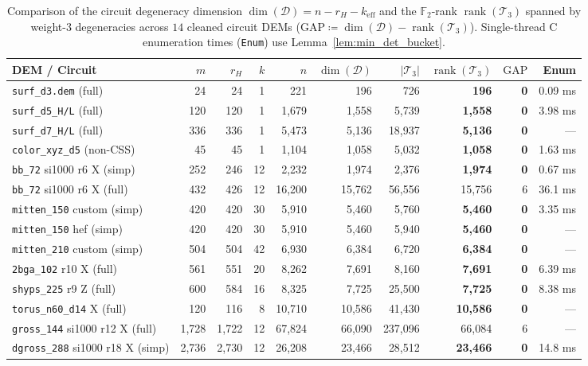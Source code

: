 \documentclass[12pt]{article}
\theoremstyle{definition}
\newcommand{\Ftwo}{\mathbb{F}_2}
\DeclareMathOperator{\rank}{rank}
\newcommand{\Dc}{\mathcal{D}}
\newcommand{\Tc}{\mathcal{T}_3}
\newcommand{\ttt}[1]{\texttt{#1}}
\begin{document}
\begin{table}[htbp]
\centering
\caption{Comparison of the circuit degeneracy dimension $\dim(\Dc) = n - r_H - k_{\mathrm{eff}}$ and the
$\Ftwo$-rank $\rank(\Tc)$ spanned by weight-3 degeneracies across $14$ cleaned circuit DEMs ($\mathrm{GAP}
\coloneqq \dim(\Dc) - \rank(\Tc)$). Single-thread C enumeration times (\ttt{Enum}) use
Lemma~\ref{lem:min_det_bucket}.}\label{tab:t3_span}
\smallskip
\footnotesize
\setlength{\tabcolsep}{4.0pt}
\begin{tabular}{@{}lrrrrrrrrr@{}}
\toprule
DEM / Circuit & $m$ & $r_H$ & $k$ & $n$ & $\dim(\Dc)$ & $|\Tc|$ & $\rank(\Tc)$ & $\mathrm{GAP}$ & Enum \\
\midrule
\ttt{surf\_d3.dem} (full) & 24 & 24 & 1 & 221 & 196 & 726 & \textbf{196} & \textbf{0} & 0.09 ms \\
\ttt{surf\_d5\_H/L} (full) & 120 & 120 & 1 & 1,679 & 1,558 & 5,739 & \textbf{1,558} & \textbf{0} & 3.98 ms \\
\ttt{surf\_d7\_H/L} (full) & 336 & 336 & 1 & 5,473 & 5,136 & 18,937 & \textbf{5,136} & \textbf{0} & --- \\
\ttt{color\_xyz\_d5} (non-CSS) & 45 & 45 & 1 & 1,104 & 1,058 & 5,032 & \textbf{1,058} & \textbf{0} & 1.63 ms \\
\ttt{bb\_72} si1000 r6 X (simp) & 252 & 246 & 12 & 2,232 & 1,974 & 2,376 & \textbf{1,974} & \textbf{0} & 0.67 ms \\
\ttt{bb\_72} si1000 r6 X (full) & 432 & 426 & 12 & 16,200 & 15,762 & 56,556 & 15,756 & 6 & 36.1 ms \\
\ttt{mitten\_150} custom (simp) & 420 & 420 & 30 & 5,910 & 5,460 & 5,760 & \textbf{5,460} & \textbf{0} & 3.35 ms \\
\ttt{mitten\_150} hef (simp) & 420 & 420 & 30 & 5,910 & 5,460 & 5,940 & \textbf{5,460} & \textbf{0} & --- \\
\ttt{mitten\_210} custom (simp) & 504 & 504 & 42 & 6,930 & 6,384 & 6,720 & \textbf{6,384} & \textbf{0} & --- \\
\ttt{2bga\_102} r10 X (full) & 561 & 551 & 20 & 8,262 & 7,691 & 8,160 & \textbf{7,691} & \textbf{0} & 6.39 ms \\
\ttt{shyps\_225} r9 Z (full) & 600 & 584 & 16 & 8,325 & 7,725 & 25,500 & \textbf{7,725} & \textbf{0} & 8.38 ms \\
\ttt{torus\_n60\_d14} X (full) & 120 & 116 & 8 & 10,710 & 10,586 & 41,430 & \textbf{10,586} & \textbf{0} & --- \\
\ttt{gross\_144} si1000 r12 X (full) & 1,728 & 1,722 & 12 & 67,824 & 66,090 & 237,096 & 66,084 & 6 & --- \\
\ttt{dgross\_288} si1000 r18 X (simp) & 2,736 & 2,730 & 12 & 26,208 & 23,466 & 28,512 & \textbf{23,466} & \textbf{0} &
  14.8 ms \\
\bottomrule
\end{tabular}
\end{table}
\end{document}
